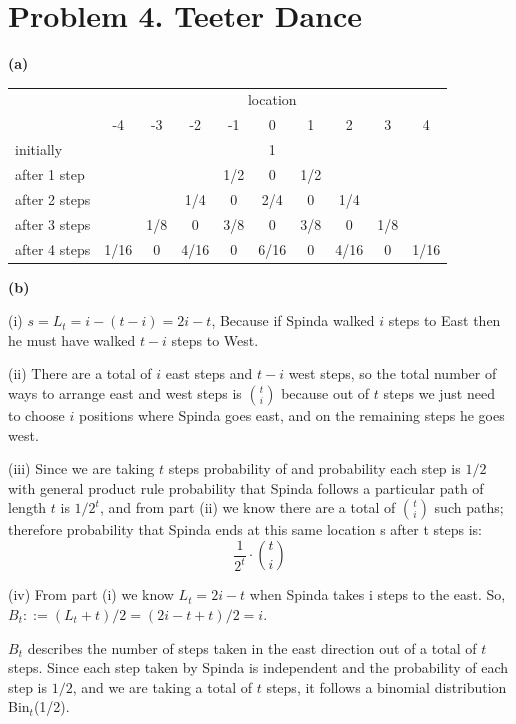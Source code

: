 \documentclass{article}
\begin{document}
\section*{Problem 4. Teeter Dance}

\textbf{(a)}
\begin{center}
\begin{tabular}{l | c c c c c c c c c}
& \multicolumn{9}{c}{location} \\
& -4 & -3 & -2 & -1 & 0 & 1 & 2 & 3 & 4 \\
\hline \hline
initially & & & & & 1 & & & & \\
after 1 step & & & & 1/2 & 0 & 1/2 & & & \\
after 2 steps & & & 1/4 & 0 & 2/4 & 0 & 1/4 & & \\
after 3 steps & & 1/8 & 0 & 3/8 & 0 & 3/8 & 0 & 1/8 & \\
after 4 steps & 1/16 & 0 & 4/16 & 0 & 6/16 & 0 & 4/16 & 0 & 1/16 \\
\end{tabular}
\end{center}

\vspace{\baselineskip}
\noindent\textbf{(b)}

(i) $s= L_t = i - (t - i) = 2i - t$, Because if Spinda walked $i$ steps to East then he must have walked $t - i$ steps to West.

(ii) There are a total of $i$ east steps and $t-i$ west steps, so the total number of ways to arrange east and west steps is $\binom{t}{i}$ because out of $t$ steps
we just need to choose $i$ positions where Spinda goes east, and on the remaining steps he goes west.

(iii) Since we are taking $t$ steps probability of and probability each step is $1/2$ with general product rule probability that
Spinda follows a particular path of length $t$ is $1/2^t$, and from part (ii) we know there are a total of $\binom{t}{i}$ such paths; therefore
probability that Spinda ends at this same location s after t steps is:
\[\frac{1}{2^t} \cdot \binom{t}{i}\]

(iv) From part (i) we know $L_t = 2i - t$ when Spinda takes i steps to the east. So, $B_t ::= (L_t + t)/2 = (2i - t + t)/2 = i$.

$B_t$ describes the number of steps taken in the east direction out of a total of $t$ steps.
Since each step taken by Spinda is independent and the probability of each step is $1/2$, and we are taking a total of $t$
steps, it follows a binomial distribution Bin$_t$(1/2).
\end{document}
